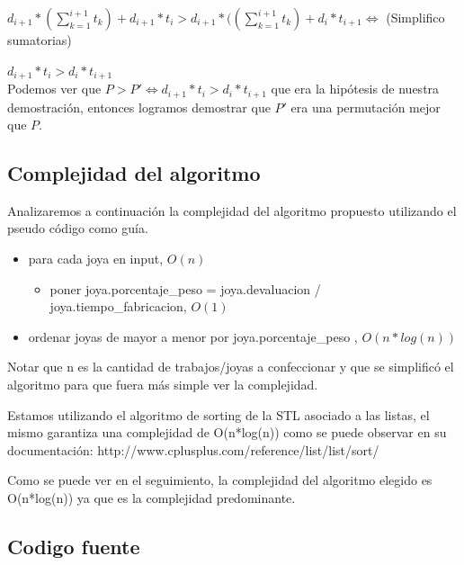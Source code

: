 $d_{i+1}*(\sum\limits_{k=1}^{i+1} t_k) + d_{i+1}*t_i > d_{i+1}*((\sum\limits_{k=1}^{i+1} t_k) + d_i*t_{i+1} \Longleftrightarrow$ (Simplifico sumatorias)

$d_{i+1}*t_i > d_i*t_{i+1}$ \\

Podemos ver que $P > P' \Longleftrightarrow d_{i+1}*t_i > d_i*t_{i+1}$ que era la hip\'otesis de nuestra demostraci\'on, entonces logramos demostrar que $P'$ era una permutaci\'on mejor que $P$.

\subsection{Complejidad del algoritmo}

Analizaremos a continuaci\'on la complejidad del algoritmo propuesto utilizando el pseudo c\'odigo como gu\'ia.

\begin{itemize}
\item para cada  joya en input, $O(n)$
\begin{itemize}
\item poner joya.porcentaje\_peso = joya.devaluacion / joya.tiempo\_fabricacion, $O(1)$
\end{itemize}

\item ordenar joyas de mayor a menor por joya.porcentaje\_peso , $O(n*log(n))$
\end{itemize}

Notar que n es la cantidad de trabajos/joyas a confeccionar y que se simplific\'o el algoritmo para que fuera m\'as simple ver la complejidad.

Estamos utilizando el algoritmo de sorting de la STL asociado a las listas, el mismo garantiza una complejidad de O(n*log(n)) como se puede observar en su documentaci\'on: http://www.cplusplus.com/reference/list/list/sort/

Como se puede ver en el seguimiento, la complejidad del algoritmo elegido es O(n*log(n)) ya que es la complejidad predominante.\\

\newpage
\subsection{Codigo fuente}

